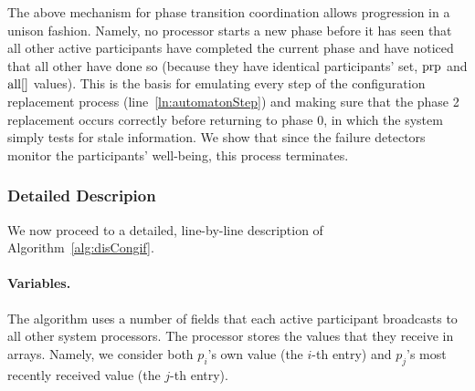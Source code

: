\documentclass[11pt]{article}
\begin{document}
The above mechanism for phase transition coordination allows progression in a unison fashion. Namely, no processor starts a new phase before it has seen that all other active participants have completed the current phase and have noticed that all other have done so (because they have identical participants' set, $\textnormal{prp}$ and $\textnormal{all}[]$ values). This is the basis for emulating every step of the configuration replacement process (line~\ref{ln:automatonStep}) and making sure that the phase 2 replacement occurs correctly before returning to phase 0, in which the system simply tests for stale information. We show that since the failure detectors monitor the participants' well-being, this process terminates.


\subsubsection*{Detailed Descripion}

We now proceed to a detailed, line-by-line description of Algorithm~\ref{alg:disCongif}.

\paragraph{Variables.}
The algorithm uses a number of fields
that each active participant broadcasts to all other system processors. The processor stores the values that they receive in arrays. Namely, we consider both $p_i$'s own value (the $i$-th entry) and $p_j$'s most recently received value (the $j$-th entry).  
\end{document}
